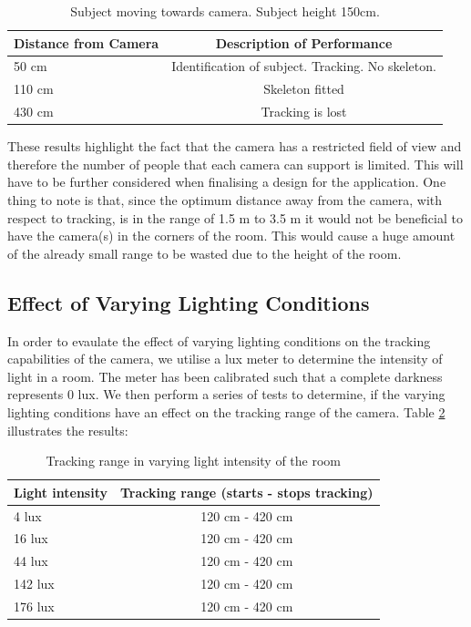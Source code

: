 \documentclass[11pt,a4paper]{article}
\begin{document}
\begin{table}[H]
\center
\begin{tabular}{ | l | c |}
\hline
Distance from Camera & Description of Performance \\
\hline
50 cm & Identification of subject. Tracking. No skeleton.\\
110 cm & Skeleton fitted\\
430 cm & Tracking is lost\\
\hline
\end{tabular}
\caption{Subject moving towards camera. Subject height 150cm.}
\label{cam_range_150_toward}
\end{table}
\noindent
These results highlight the fact that the camera has a restricted field of view and therefore the number of people that each camera can support is limited. This will have to be further considered when finalising a design for the application. One thing to note is that, since  the optimum distance away from the camera, with respect to tracking, is in the range of 1.5 m to 3.5 m it would not be beneficial to have the camera(s) in the corners of the room. This would cause a huge amount of the already small range to be wasted due to the height of the room. 

\subsection{Effect of Varying Lighting Conditions}
\noindent
In order to evaulate the effect of varying lighting conditions on the tracking capabilities of the camera, we utilise a lux meter to determine the intensity of light in a room. The meter has been calibrated such that a complete darkness represents 0 lux. We then perform a series of tests to determine, if the varying lighting conditions have an effect on the tracking range of the camera. Table \ref{cam_range_varying_light} illustrates the results:
\begin{table}[H]
\center
\begin{tabular}{ | l | c |}
\hline
Light intensity & Tracking range (starts - stops tracking) \\
\hline
4 lux & 120 cm - 420 cm\\
16 lux & 120 cm - 420 cm\\
44 lux & 120 cm - 420 cm\\
142 lux & 120 cm - 420 cm\\
176 lux & 120 cm - 420 cm\\
\hline
\end{tabular}
\caption{Tracking range in varying light intensity of the room}
\label{cam_range_varying_light}
\end{table}
\end{document}
